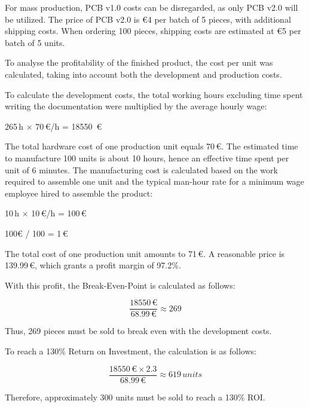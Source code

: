 \newpage

For mass production, PCB v1.0 costs can be disregarded, as only PCB v2.0 will be utilized. The price of PCB v2.0 is €4 per batch of 5 pieces, with additional shipping costs. When ordering 100 pieces, shipping costs are estimated at €5 per batch of 5 units.

To analyse the profitability of the finished product, the cost per unit was calculated, taking into account both the development and production costs.

To calculate the development costs, the total working hours excluding time spent writing the documentation were multiplied by the average hourly wage:

\vspace{0.5cm}
\begin{center}
265\,h $\times$ 70\,€{}/h = 18550 \,€{}
\end{center}
\vspace{0.5cm}
 
The total hardware cost of one production unit equals 70\,€.  
The estimated time to manufacture 100 units is about 10 hours, hence an effective time spent per unit of 6 minutes.
The manufacturing cost is calculated based on the work required to assemble one unit and the typical man-hour rate for a minimum wage employee hired to assemble the product:

\vspace{0.5cm}
\begin{center}
10\,h $\times$ 10\,€{}/h = 100\,€{}
\end{center}

\begin{center}
100€ / 100 = 1\,€{}
\end{center}
\vspace{0.5cm}

The total cost of one production unit amounts to 71\,€. 
A reasonable price is 139.99\,€, 
which grants a profit margin of 97.2\%.

With this profit, the Break-Even-Point is calculated as follows:

\vspace{0.5cm}
\begin{center}
\[
\frac{18550\,€}{68.99\,€} \approx 269
\]
\end{center}
\vspace{0.5cm}

Thus, 269 pieces must be sold to break even with the development costs.

To reach a 130\% Return on Investment, the calculation is as follows:

\vspace{0.5cm}
\begin{center}
\[
\frac{18550\,€{} \times 2.3}{68.99\,€{}} \approx 619\,units
\]
\end{center}
\vspace{0.5cm}

Therefore, approximately 300 units must be sold to reach a 130\% ROI.